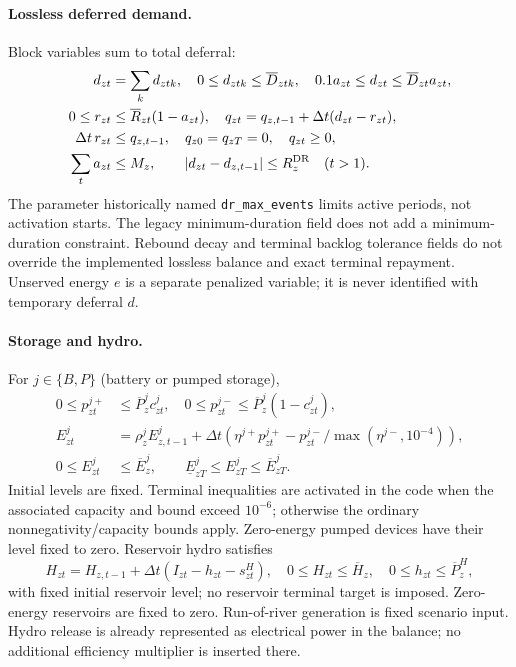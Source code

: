 \paragraph{Lossless deferred demand.}
Block variables sum to total deferral:
\begin{align}
 d_{zt}&=\sum_kd_{ztk},\quad0\le d_{ztk}\le\overline D_{ztk},\quad
 0.1a_{zt}\le d_{zt}\le\overline D_{zt}a_{zt},\\
 0\le r_{zt}&\le\overline R_{zt}(1-a_{zt}),\quad
 q_{zt}=q_{z,t-1}+\Delta t(d_{zt}-r_{zt}),\\
 \Delta t\,r_{zt}&\le q_{z,t-1},\quad q_{z0}=q_{zT}=0,\quad q_{zt}\ge0,\\
 \sum_t a_{zt}&\le M_z,\qquad |d_{zt}-d_{z,t-1}|\le R^{\rm DR}_z\quad(t>1).
\end{align}
The parameter historically named \texttt{dr\_max\_events} limits active
periods, not activation starts. The legacy minimum-duration field does not
add a minimum-duration constraint. Rebound decay and terminal backlog
tolerance fields do not override the implemented lossless balance and exact
terminal repayment. Unserved energy $e$ is a separate penalized variable;
it is never identified with temporary deferral $d$.

\paragraph{Storage and hydro.}
For $j\in\{B,P\}$ (battery or pumped storage),
\begin{align}
 0\le p^{j+}_{zt}&\le\overline P^j_zc^j_{zt},\quad
 0\le p^{j-}_{zt}\le\overline P^j_z(1-c^j_{zt}),\\
 E^j_{zt}&=\rho^j_zE^j_{z,t-1}
 +\Delta t\left(\eta^{j+}p^{j+}_{zt}-p^{j-}_{zt}/\max(\eta^{j-},10^{-4})\right),\\
 0\le E^j_{zt}&\le\overline E^j_z,\qquad
 \underline E^j_{zT}\le E^j_{zT}\le\overline E^j_{zT}.
\end{align}
Initial levels are fixed. Terminal inequalities are activated in the code
when the associated capacity and bound exceed $10^{-6}$; otherwise the
ordinary nonnegativity/capacity bounds apply. Zero-energy pumped devices
have their level fixed to zero. Reservoir hydro satisfies
\begin{equation}
 H_{zt}=H_{z,t-1}+\Delta t(I_{zt}-h_{zt}-s^H_{zt}),\quad
 0\le H_{zt}\le\overline H_z,\quad0\le h_{zt}\le\overline P^H_z,
\end{equation}
with fixed initial reservoir level; no reservoir terminal target is imposed.
Zero-energy reservoirs are fixed to zero. Run-of-river generation is fixed
scenario input. Hydro release is already represented as electrical power
in the balance; no additional efficiency multiplier is inserted there.

